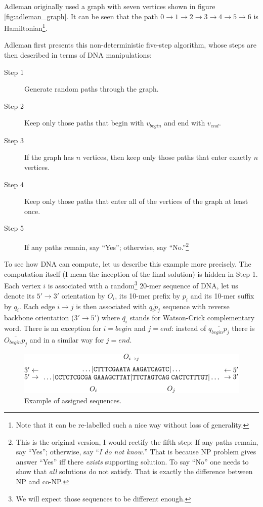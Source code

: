 	Adleman originally used a graph with seven vertices shown in figure \ref{fig:adleman_graph}. It can be seen that the path $0 \rightarrow 1 \rightarrow 2 \rightarrow 3 \rightarrow 4 \rightarrow 5 \rightarrow 6$ is Hamiltonian\footnote{Note that it can be re-labelled such a nice way without loss of generality.}.
	
	Adleman first presents this non-deterministic five-step algorithm, whose steps are then described in terms of DNA manipulations:
	\begin{description}
		\item[Step 1] Generate random paths through the graph.
		\item[Step 2] Keep only those paths that begin with $v_{begin}$ and end with $v_{end}$.
		\item[Step 3] If the graph has $n$ vertices, then keep only those paths that enter exactly $n$ vertices.
		\item[Step 4] Keep only those paths that enter all of the vertices of the graph at least once.
		\item[Step 5] If any paths remain, say ``Yes''; otherwise, say ``No.''\footnote{This is the original version, I would rectify the fifth step: If any paths remain, say ``Yes''; otherwise, say ``{\em I do not know.}'' That is because NP problem gives answer ``Yes'' iff there {\em exists} supporting solution. To say ``No'' one needs to show that {\em all} solutions do not satisfy. That is exactly the difference between NP and co-NP.}
	\end{description}
	To see %
	how DNA can compute, let us describe this example more precisely. The computation itself (I mean the inception of the final solution) is hidden in Step 1. Each vertex $i$ is associated with a random\footnote{We will expect those sequences to be different enough.} $20$-mer sequence of DNA, let us denote its $5'\rightarrow 3'$ orientation by $O_i$, its 10-mer prefix by $p_i$ and its 10-mer suffix by $q_i$. Each edge $i\rightarrow j$ is then associated with $\overline{q_i p_j}$ sequence with reverse backbone orientation ($3'\rightarrow 5'$) where $\overline{q_i}$ stands for Watson-Crick complementary word. There is an exception for $i=begin$ and $j=end$: instead of $\overline{q_{begin} p_j}$ there is $\overline{O_{begin} p_j}$ and in a similar way for $j=end$.
	
	\begin{figure}[H]
	\begin{center}
		\includegraphics{./figures/adleman_strands.pdf}
		\caption{Example of assigned sequences.}
		\label{fig:adleman_strands}
	\end{center}
	\end{figure}
	
